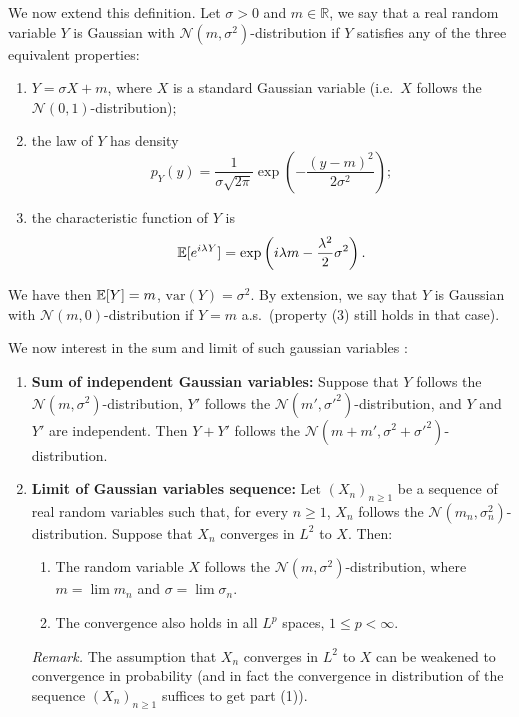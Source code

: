 \documentclass[../Main.tex]{subfiles}
\begin{document}
We now extend this definition. Let $\sigma>0$ and $m\in\mathbb R$, we say that a real random variable $Y$ is Gaussian with $\mathcal N(m,\sigma^2)$-distribution if $Y$ satisfies any of the three equivalent properties:
\begin{enumerate}
\item $Y = \sigma X + m$, where $X$ is a standard Gaussian variable (i.e.\ $X$ follows the $\mathcal N(0,1)$-distribution);
\item the law of $Y$ has density
\[ p_Y(y) = \frac{1}{\sigma\sqrt{2\pi}}\exp\left(-\frac{(y-m)^2}{2\sigma^2}\right); \]
\item the characteristic function of $Y$ is
\[ \mathbb{E}[e^{i\lambda Y}] = \exp\left(i\lambda m - \frac{\lambda^2}{2}\sigma^2\right). \]
\end{enumerate}
We have then $\mathbb{E}[Y]=m$, $\mathrm{var}(Y)=\sigma^2$.
By extension, we say that $Y$ is Gaussian with $\mathcal N(m,0)$-distribution if $Y=m$ a.s.\ (property (3) still holds in that case).

We now interest in the sum and limit of such gaussian variables : 
\begin{enumerate}
    \item \textbf{Sum of independent Gaussian variables:} Suppose that $Y$ follows the $\mathcal N(m,\sigma^2)$-distribution, $Y'$ follows the $\mathcal N(m',\sigma'^2)$-distribution, and $Y$ and $Y'$ are independent. Then $Y+Y'$ follows the $\mathcal N(m+m',\sigma^2+\sigma'^2)$-distribution. 
    \item \textbf{Limit of Gaussian variables sequence:} Let $(X_n)_{n\geq 1}$ be a sequence of real random variables such that, for every $n\geq 1$, $X_n$ follows the $\mathcal N(m_n,\sigma_n^2)$-distribution. Suppose that $X_n$ converges in $L^2$ to $X$. Then:
    \begin{enumerate}
        \item The random variable $X$ follows the $\mathcal N(m,\sigma^2)$-distribution, where $m=\lim m_n$ and $\sigma=\lim \sigma_n$.
        \item The convergence also holds in all $L^p$ spaces, $1\leq p <\infty$.
    \end{enumerate}
    \noindent\textit{Remark.} The assumption that $X_n$ converges in $L^2$ to $X$ can be weakened to convergence in probability (and in fact the convergence in distribution of the sequence $(X_n)_{n\geq 1}$ suffices to get part (1)).
\end{enumerate}
\end{document}
